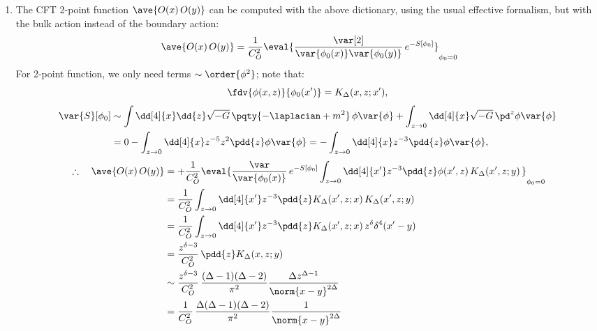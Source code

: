 \documentclass[a4paper,10pt]{article}
\begin{document}
\begin{enumerate}
\begin{enumerate}
	\item The CFT 2-point function $
		\ave{O(x)\,O(y)}
	$ can be computed with the above dictionary, using the usual effective formalism, but with the bulk action instead of the boundary action:
	\begin{equation}
		\ave{O(x)\,O(y)}
		= \frac{1}{C_O^2}
			\eval{
				\frac{\var[2]}{
					\var{\phi_0(x)} \var{\phi_0(y)}
				}\, e^{-S[\phi_0]}
			}_{\phi_0=0}\!\!
	\end{equation}
	For 2-point function, we only need terms $\sim\order{\phi^2}$; note that:
	\begin{equation}
		\fdv{\phi(x,z)}{\phi_0(x')}
		= K_\Delta(x,z;x'),
	\end{equation}
	\vspace{-.5\baselineskip}
	\begin{equation}
	\begin{aligned}
		\var{S}[\phi_0]
		&\sim \int \dd[4]{x} \dd{z} \sqrt{-G}\,
				\pqty{-\laplacian + m^2}\,\phi \var{\phi}
			+ \int_{z\to 0} \dd[4]{x} \sqrt{-G}\,
				\pd^{z} \phi \var{\phi} \\
		&= 0 - \int_{z\to 0} \dd[4]{x}
				z^{-5} z^2
				\pdd{z} \phi \var{\phi}
		= -\int_{z\to 0} \dd[4]{x}
				z^{-3}
				\pdd{z} \phi \var{\phi},
	\end{aligned}
	\end{equation}
	\begin{equation}
	\begin{aligned}
		\therefore\quad
		\ave{O(x)\,O(y)}
		&= +\frac{1}{C_O^2}
			\eval{
				\frac{\var}{
					\var{\phi_0(x)}
				}\, e^{-S[\phi_0]}
				\int_{z\to 0} \dd[4]{x'} z^{-3}
					\pdd{z} \phi(x',z)\,
					K_\Delta(x',z;y)\,
			}_{\phi_0=0}\!\! \\
		&= \frac{1}{C_O^2}
				\int_{z\to 0} \dd[4]{x'} z^{-3}
					\pdd{z} K_\Delta(x',z;x)\,
					K_\Delta(x',z;y) \\
		&= \frac{1}{C_O^2}
				\int_{z\to 0} \dd[4]{x'} z^{-3}
					\pdd{z} K_\Delta(x',z;x)\,
					z^\delta \delta^4(x' - y) \\
		&= \frac{z^{\delta - 3}}{C_O^2}\,
			\pdd{z} K_\Delta(x,z;y) \\
		&\sim \frac{z^{\delta-3}}{C_O^2}\,
			\frac{(\Delta - 1)(\Delta - 2)}{\pi^2}
			\frac{
				\Delta z^{\Delta-1}
			}{\norm{x - y}^{2\Delta}} \\
		&= \frac{1}{C_O^2}\,
			\frac{\Delta(\Delta - 1)(\Delta - 2)}{\pi^2}
			\frac{1}{\norm{x - y}^{2\Delta}} \\
	\end{aligned}
	\end{equation}
	

\end{enumerate}
\end{enumerate}
\end{document}
